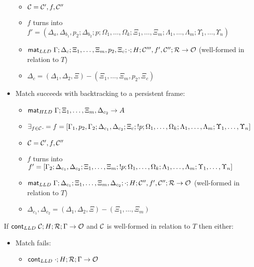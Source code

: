 \begin{lemma}
\begin{itemize}[leftmargin=*]
\begin{itemize}[leftmargin=\secondm]
      \item $\mathcal{C} = \mathcal{C'}, f, \mathcal{C''}$

      \item $f$ turns into $f' = (\Delta_a, \Delta_{b_1}, p_2;
            \Delta_{b_2}; p; \Omega_1, \dotsc, \Omega_k; \Xi_1, \dotsc, \Xi_m;
            \Lambda_1, \dotsc, \Lambda_m; \Upsilon_1, \dotsc, \Upsilon_n)$

      \item $\mathsf{mat}_{LLD} \; \Gamma; \Delta_c; \Xi_1, \dotsc, \Xi_m, p_2, \Xi_c; \cdot; H;
            \mathcal{C'''}, f', \mathcal{C''}; \mathcal{R} \rightarrow \mathcal{O}$ (well-formed in
                  relation to $T$)
      \item $\Delta_c = (\Delta_1, \Delta_2, \Xi) - (\Xi_1, \dotsc, \Xi_m, p_2, \Xi_c)$
   \end{itemize}

   \item Match succeeds with backtracking to a persistent frame:
   \begin{itemize}[leftmargin=\secondm]
      \item $\mathsf{mat}_{HLD} \; \Gamma; \Xi_1, \dotsc, \Xi_m, \Delta_{c_2} \rightarrow A$
      \item $\exists_{f \in \mathcal{C}}. = f = [\Gamma_1, p_2, \Gamma_2; \Delta_{c_1}, \Delta_{c_2}; \Xi_c; {!}
         p; \Omega_1, \dotsc, \Omega_k; \Lambda_1, \dotsc, \Lambda_m;
         \Upsilon_1, \dotsc, \Upsilon_n]$
      \item $\mathcal{C} = \mathcal{C'}, f, \mathcal{C''}$
      \item $f$ turns into $f' = [\Gamma_2; \Delta_{c_1}, \Delta_{c_2}; \Xi_1, \dotsc,
         \Xi_m; {!} p; \Omega_1, \dotsc, \Omega_k; \Lambda_1, \dotsc,
         \Lambda_m; \Upsilon_1, \dotsc, \Upsilon_n]$
      \item $\mathsf{mat}_{LLD} \; \Gamma; \Delta_{c_1}; \Xi_1, \dotsc, \Xi_m, \Delta_{c_2};
         \cdot; H; \mathcal{C''}, f', \mathcal{C''}; \mathcal{R} \rightarrow \mathcal{O}$ (well-formed in
            relation to $T$)
      \item $\Delta_{c_1}, \Delta_{c_2} = (\Delta_1, \Delta_2,
            \Xi) - (\Xi_1, \dotsc, \Xi_m)$
   \end{itemize}
\end{itemize}

If $\mathsf{cont}_{LLD} \; \mathcal{C}; H; \mathcal{R}; \Gamma \rightarrow \mathcal{O}$ and $\mathcal{C}$ is
well-formed in relation to $T$ then either:

\begin{itemize}[leftmargin=*]
   \item Match fails:
   \begin{itemize}[leftmargin=\secondm]
      \item $\mathsf{cont}_{LLD} \; \cdot; H; \mathcal{R}; \Gamma \rightarrow \mathcal{O}$
   \end{itemize}


\end{itemize}
\end{lemma}
